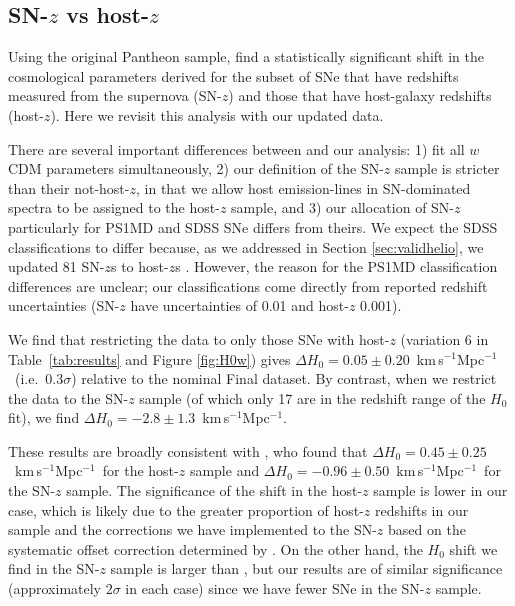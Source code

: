 \documentclass[
  journal=pasa,
  manuscript=research-paper,
  year=2022,
]{cup-journal}
\newcommand{\tten}[1]{\ensuremath{\times 10^{#1}}}
\newcommand{\kmsMpc}{km\,s$^{-1}$Mpc$^{-1}$}
\begin{document}
\subsection{SN-$z$ vs host-$z$}\label{subsec:SNonly}
Using the original Pantheon sample, \citet{Steinhardt2020} find a statistically significant shift in the cosmological parameters derived for the subset of SNe that have redshifts measured from the supernova (SN-$z$) and those that have host-galaxy redshifts (host-$z$). 
Here we revisit this analysis with our updated data. 

There are several important differences between \citet{Steinhardt2020} and our analysis: 1) \citet{Steinhardt2020} fit all $w$CDM parameters simultaneously, 2) our definition of the SN-$z$ sample is stricter than their not-host-$z$, in that we allow host emission-lines in SN-dominated spectra to be assigned to the host-$z$ sample, and 3) our allocation of SN-$z$ particularly for PS1MD and SDSS SNe differs from theirs.
We expect the SDSS classifications to differ because, as we addressed in Section \ref{sec:validhelio}, we updated 81 SN-$z$s to host-$z$s \citep[and further, applied the 
$+2.2\tten{-3}$ systematic offset to the remaining SN-$z$s as determined in][]{Sako2018}.
However, the reason for the PS1MD classification differences are unclear; our classifications come directly from reported redshift uncertainties (SN-$z$ have uncertainties of 0.01 and host-$z$ 0.001).

We find that restricting the data to only those SNe with host-$z$ (variation 6 in Table~\ref{tab:results} and Figure \ref{fig:H0w}) gives $\Delta H_0=0.05\pm0.20$~\kmsMpc\ (i.e.\ $0.3\sigma$) relative to the nominal Final dataset.
By contrast, when we restrict the data to the SN-$z$ sample
(of which only 17 are in the redshift range of the $H_0$ fit), we find $\Delta H_0=-2.8\pm1.3$~\kmsMpc.

These results are broadly consistent with \citet{Steinhardt2020}, who found that $\Delta H_0= 0.45\pm 0.25$~\kmsMpc\ for the host-$z$ sample and $\Delta H_0=-0.96\pm0.50$~\kmsMpc\ for the SN-$z$ sample. 
The significance of the shift in the host-$z$ sample is lower in our case, which is likely due to the greater proportion of host-$z$ redshifts in our sample and the corrections we have implemented to the SN-$z$ based on the systematic offset correction determined by \citet{Sako2018}.  
On the other hand, the $H_0$ shift we find in the SN-$z$ sample is larger than \citet{Steinhardt2020}, but our results are of similar significance (approximately $2\sigma$ in each case) since we have fewer SNe in the SN-$z$ sample. 
\end{document}

